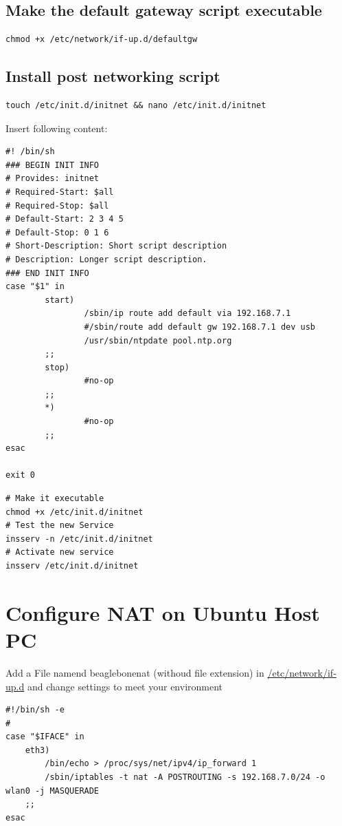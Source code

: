 \subsection{Make the default gateway script executable}
\begin{lstlisting}
chmod +x /etc/network/if-up.d/defaultgw
\end{lstlisting}

\subsection{Install post networking script}
\begin{lstlisting}
touch /etc/init.d/initnet && nano /etc/init.d/initnet
\end{lstlisting}

Insert following content:
\begin{lstlisting}
#! /bin/sh
### BEGIN INIT INFO
# Provides: initnet
# Required-Start: $all
# Required-Stop: $all
# Default-Start: 2 3 4 5
# Default-Stop: 0 1 6
# Short-Description: Short script description
# Description: Longer script description.
### END INIT INFO
case "$1" in
        start)
                /sbin/ip route add default via 192.168.7.1
                #/sbin/route add default gw 192.168.7.1 dev usb
                /usr/sbin/ntpdate pool.ntp.org
        ;;
        stop)
                #no-op
        ;;
        *)
                #no-op
        ;;
esac

exit 0

\end{lstlisting}

\begin{lstlisting}
# Make it executable
chmod +x /etc/init.d/initnet
# Test the new Service
insserv -n /etc/init.d/initnet
# Activate new service
insserv /etc/init.d/initnet
\end{lstlisting}

\section{Configure NAT on Ubuntu Host PC}
Add a File namend beaglebonenat (withoud file extension) in \url{/etc/network/if-up.d} and change settings to meet your environment

\begin{lstlisting}
#!/bin/sh -e
#
case "$IFACE" in
    eth3)
        /bin/echo > /proc/sys/net/ipv4/ip_forward 1
        /sbin/iptables -t nat -A POSTROUTING -s 192.168.7.0/24 -o wlan0 -j MASQUERADE
    ;;
esac
\end{lstlisting}


